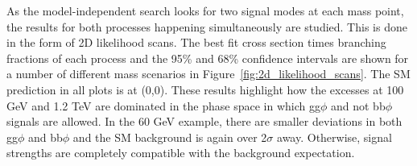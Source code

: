 As the model-independent search looks for two signal modes at each mass point, the results for both processes happening simultaneously are studied.
This is done in the form of 2D likelihood scans.
The best fit cross section times branching fractions of each process and the 95\% and 68\% confidence intervals are shown for a number of different mass scenarios in Figure~\ref{fig:2d_likelihood_scans}.
The SM prediction in all plots is at (0,0).
These results highlight how the excesses at 100 GeV and 1.2 TeV are dominated in the phase space in which gg$\phi$ and not bb$\phi$ signals are allowed.
In the 60 GeV example, there are smaller deviations in both gg$\phi$ and bb$\phi$ and the SM background is again over 2$\sigma$ away.
Otherwise, signal strengths are completely compatible with the background expectation.


\begin{figure}[!hbtp]
\centering
     \\

\end{figure}
